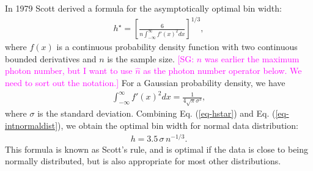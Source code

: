 \documentclass[
reprint,
superscriptaddress,
showpacs,
amsmath,
amssymb,
aps,
pra,
longbibliography
]{revtex4-1}
\providecommand{\aucmnt}[1]{#1}
\providecommand{\aucmnt}[1]{}
\newcommand{\SGc}[1]{\aucmnt{\textcolor{magenta}{[SG: #1]}}}
\begin{document}
In 1979 Scott derived a formula for the asymptotically optimal bin width:
\begin{eqnarray}
h^{\star} = \left[ \frac{6}{n \int_{-\infty}^{\infty} f'(x)^2 dx} \right]^{1/3},
\label{eq-hstar}
\end{eqnarray}
where $f(x)$ is a continuous probability density function with two
continuous bounded derivatives and $n$ is the sample size. \SGc{$n$
  was earlier the maximum photon number, but I want to use $\hat{n}$
  as the photon number operator below.  We need to sort out the
  notation.}  For a Gaussian probability density, we have
\begin{eqnarray}
\int_{-\infty}^{\infty} f'(x)^2 dx = \frac{1}{4 \sqrt{\pi} \sigma ^3},
\label{eq-intnormaldist}
\end{eqnarray}
where $\sigma$ is the standard deviation. Combining Eq. (\ref{eq-hstar}) and Eq. (\ref{eq-intnormaldist}), we obtain the 
optimal bin width for normal data distribution:
\begin{eqnarray}
h = 3.5 \, \sigma \, n^{-1/3}.
\end{eqnarray}
This formula is known as Scott's rule, and is optimal if the data is close to being normally distributed, but is also 
appropriate for most other distributions.
\end{document}
